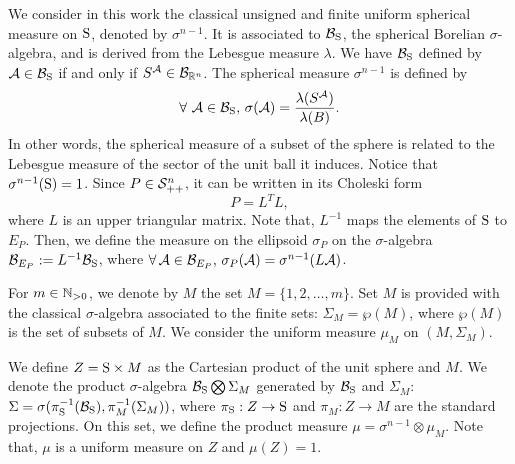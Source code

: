 We consider in this work the classical unsigned and finite uniform spherical measure on $\text{S}$, denoted by $\sigma^{n-1}$. It is associated to $\mathcal{B}_{\text{S}}$, the spherical Borelian $\sigma$-algebra, and is derived from the Lebesgue measure $\lambda$. We have $\mathcal{B}_{\text{S}}$ defined by $\mathcal{A} \in \mathcal{B}_{\text{S}}$ if and only if $S^{\mathcal{A}} \in \mathcal{B}_{\mathbb{R}^n}$. The spherical measure $\sigma^{n-1}$ is defined by
$$\forall\ \mathcal{A} \in \mathcal{B}_{\text{S}},\, \sigma(\mathcal{A}) = \frac{\lambda(S^{\mathcal{A}})}{\lambda(B)}. $$
In other words, the spherical measure of a subset of the sphere is related to the Lebesgue measure of the sector of the unit ball it induces. Notice that $\sigma^{n-1}(\text{S}) = 1$.
Since $P \in \mathcal{S}_{++}^n$, it can be written in its Choleski form \begin{equation}\label{choleski}P = L^TL,\end{equation} where $L$ is an upper triangular matrix. Note that, $L^{-1}$ maps the elements of $\text{S}$ to $E_P$. Then, we define the measure on the ellipsoid $\sigma_P$ on the $\sigma$-algebra $\mathcal{B}_{E_P}:=L^{-1}\mathcal{B}_{\text{S}}$, where $\forall\, \mathcal{A} \in \mathcal{B}_{E_P},\, \sigma_P({\mathcal{A}}) = \sigma^{n-1}(L\mathcal{A})$. 

%
%
%


For $m \in \mathbb{N}_{>0}$, we denote by $M$ the set $M=\{1,2, \ldots,m \}$. Set $M$ is provided with the classical $\sigma$-algebra associated to the finite sets: $\Sigma_M = \wp(M)$, where $\wp(M)$ is the set of subsets of $M$. We consider the uniform measure $\mu_M$ on $(M, \Sigma_M)$. 

We define $Z = \text{S} \times M$ as the Cartesian product of the unit sphere and $M$. We denote the product $\sigma$-algebra $\mathcal{B}_{\text{S}} \bigotimes \Sigma_M$ generated by $\mathcal{B}_{\text{S}}$ and $\Sigma_M$: $\Sigma = \sigma( \pi_{\text{S}}^{-1}(\mathcal{B}_{\text{S}}),  \pi_{M}^{-1}(\Sigma_M))$, where $\pi_{\text{S}}:Z \to \text{S}$ and $\pi_M: Z \to M$ are the standard projections. On this set, we define the product measure $\mu = \sigma^{n-1} \otimes \mu_M$. Note that, $\mu$ is a uniform measure on $Z$ and $\mu(Z)=1$.  
